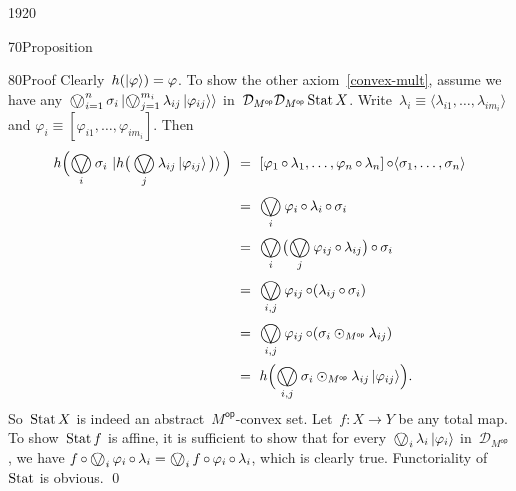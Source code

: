 \begin{parsec}{1920}
\begin{point}{70}{Proposition}
\begin{point}{80}{Proof}
Clearly~$h(\ket{\varphi}) = \varphi$.
To show the other axiom~\eqref{convex-mult},
assume we have any~$\bigovee^n_{i=1} \sigma_i \ket{\bigovee^{m_i}_{j=1} \lambda_{ij} \ket{\varphi_{ij}}}$
in~$\mathcal{D}_{M^\mathsf{op}} \mathcal{D}_{M^{\mathsf{op}}} \operatorname{Stat} X$.
Write~$\lambda_i \equiv \langle\lambda_{i1}, \ldots, \lambda_{im_i}\rangle$
and $\varphi_i \equiv [\varphi_{i1}, \ldots, \varphi_{i{m_i}}]$.
Then
\begin{align*}
    h \Bigl( \bigovee_i \sigma_i \, \ket{
        h\bigl(\, \bigovee_j \lambda_{ij} \ket{\varphi_{ij}}\, \bigr)
    } \, \Bigr)
    &\ = \ 
    [\varphi_1 \after \lambda_1, \ldots, 
    \varphi_n \after \lambda_n] \after \langle
    \sigma_1, \ldots, \sigma_n
    \rangle
    \\ & \ = \ 
    \bigovee_{i} \varphi_i \after \lambda_i \after \sigma_i
    \\ & \ = \ 
    \bigovee_{i} \bigl(\bigovee_j \varphi_{ij} \after \lambda_{ij}\bigr) \after \sigma_i
    \\ & \ = \ 
    \bigovee_{i,j} \varphi_{ij} \after (\lambda_{ij} \after \sigma_i)
    \\ & \ = \ 
    \bigovee_{i,j} \varphi_{ij} \after (\sigma_i \odot_{M^{\mathsf{op}}} \lambda_{ij})
    \\ & \ = \ 
    h \Bigl( \bigovee_{i,j} \sigma_i \odot_{M^{\mathsf{op}}} \lambda_{ij} \ket{\varphi_{ij}} \Bigr).
\end{align*}
So~$\operatorname{Stat} X$ is indeed an abstract~$M^{\mathsf{op}}$-convex set.
Let~$f\colon X \to Y$ be any total map.
To show~$\operatorname{Stat} f$ is affine,
it is sufficient to show that
for every~$\bigovee_i \lambda_i \ket{\varphi_i}$
 in~$\mathcal{D}_{M^{\mathsf{op}}}$,
 we have
        $f \after \bigovee_i  \varphi_i \after \lambda_i 
         = 
        \bigovee_i f \after  \varphi_i \after \lambda_i$,
        which is clearly true.
    Functoriality of~$\operatorname{Stat}$ is obvious. \qed
\end{point}
\end{point}
\end{parsec}

